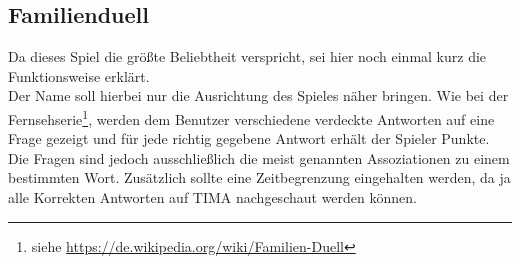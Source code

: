 \subsection*{Familienduell}
Da dieses Spiel die größte Beliebtheit verspricht, sei hier noch einmal kurz
die Funktionsweise erklärt.\\
Der Name soll hierbei nur die Ausrichtung des Spieles näher bringen.
Wie bei der
Fernsehserie\footnote{siehe \url{https://de.wikipedia.org/wiki/Familien-Duell}},
werden dem Benutzer verschiedene verdeckte Antworten auf eine Frage gezeigt
und für jede richtig gegebene Antwort erhält der Spieler Punkte.
Die Fragen sind jedoch ausschließlich die meist genannten Assoziationen zu einem
bestimmten Wort. Zusätzlich sollte eine Zeitbegrenzung eingehalten werden, da ja
alle Korrekten Antworten auf TIMA nachgeschaut werden können.
























